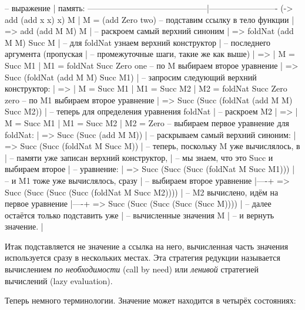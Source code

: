 \begin{code}
--  выражение                               | память:
--------------------------------------------|-------------------------
    (\x -> add (add x x) x) M               | M = (add Zero two)
-- подставим ссылку в тело функции          |
=>  add (add M M) M                         |
-- раскроем самый верхний синоним           |
=>  foldNat (add M M) Succ M                |
-- для foldNat узнаем верхний конструктор   |
-- последнего аргумента (пропуская          |
-- промежуточные шаги, такие же как выше)   |
=>                                          | M  = Succ M1
                                            | M1 = foldNat Succ Zero one
-- по M выбираем второе уравнение           |
=> Succ (foldNat (add M M) Succ M1)         |
-- запросим следующий верхний конструктор:  |
=>                                          | M  = Succ M1
                                            | M1 = Succ M2
                                            | M2 = foldNat Succ Zero zero
-- по M1 выбираем второе уравнение          |
=> Succ (Succ (foldNat (add M M) Succ M2))  | 
-- теперь для определения уравнения foldNat |
-- раскроем M2                              |
=>                                          | M  = Succ M1
                                            | M1 = Succ M2
                                            | M2 = Zero
-- выбираем первое уравнение для foldNat:   |
=> Succ (Succ (add M M))                    |
-- раскрываем самый верхний синоним:        |
=> Succ (Succ (foldNat M Succ M))           |
-- теперь, поскольку M уже вычислялось, в   |
-- памяти уже записан верхний конструктор,  |
-- мы знаем, что это Succ и выбираем второе |
-- уравнение:                               |
=> Succ (Succ (Succ (foldNat M Succ M1)))   |
-- и M1 тоже уже вычислялось, сразу         |
-- выбираем второе уравнение                |----+
=> Succ (Succ (Succ (Succ (foldNat M Succ M2)))) |
-- M2 вычислено, идём на первое уравнение   |----+
=> Succ (Succ (Succ (Succ (Succ M))))       |
-- далее остаётся только подставить уже     |
-- вычисленные значения M                   |
-- и вернуть значение.                      |
\end{code}

Итак подставляется не значение а ссылка на него, вычисленная часть
значения используется сразу в нескольких местах. Эта стратегия редукции
называется вычислением \emph{по необходимости} (call by need) или
\emph{ленивой} стратегией вычислений (lazy evaluation).

Теперь немного терминологии. Значение может находится в четырёх
состояниях:

